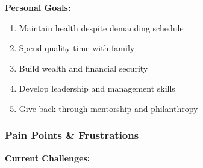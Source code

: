 \textbf{Personal Goals:}
\begin{enumerate}
    \item Maintain health despite demanding schedule
    \item Spend quality time with family
    \item Build wealth and financial security
    \item Develop leadership and management skills
    \item Give back through mentorship and philanthropy
\end{enumerate}

\subsubsection{Pain Points \& Frustrations}

\textbf{Current Challenges:}

